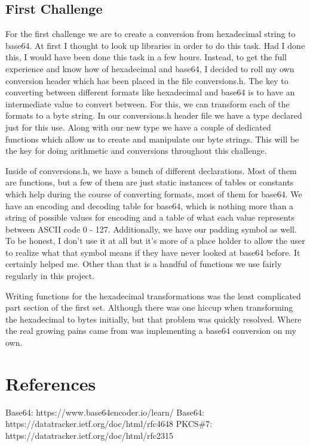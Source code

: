 \documentclass{report}
\begin{document}
	\subsection*{First Challenge}
		For the first challenge we are to create a conversion from hexadecimal string to base64. At first I thought to look up libraries in order to do this task. Had I done this, I would have been done this task in a few hours. Instead, to get the full experience and know how of hexadecimal and base64, I decided to roll my own conversion header which has been placed in the file conversions.h. The key to converting between different formats like hexadecimal and base64 is to have an intermediate value to convert between. For this, we can transform each of the formats to a byte string. In our conversions.h header file we have a type declared just for this use. Along with our new type we have a couple of dedicated functions which allow us to create and manipulate our byte strings. This will be the key for doing arithmetic and conversions throughout this challenge.
		\par
		Inside of conversions.h, we have a bunch of different declarations. Most of them are functions, but a few of them are just static instances of tables or constants which help during the course of converting formats, most of them for base64. We have an encoding and decoding table for base64, which is nothing more than a string of possible values for encoding and a table of what each value represents between ASCII code 0 - 127. Additionally, we have our padding symbol as well. To be honest, I don't use it at all but it's more of a place holder to allow the user to realize what that symbol means if they have never looked at base64 before. It certainly helped me. Other than that is a handful of functions we use fairly regularly in this project.
		\par 
		Writing functions for the hexadecimal transformations was the least complicated part section of the first set. Although there was one hiccup when transforming the hexadecimal to bytes initially, but that problem was quickly resolved. Where the real growing pains came from was implementing a base64 conversion on my own.
		
		
	\pagebreak
	\section*{References}
		Base64: https://www.base64encoder.io/learn/ \newline
		Base64: https://datatracker.ietf.org/doc/html/rfc4648 \newline
		PKCS\#7: https://datatracker.ietf.org/doc/html/rfc2315 \newline
	
\end{document}
